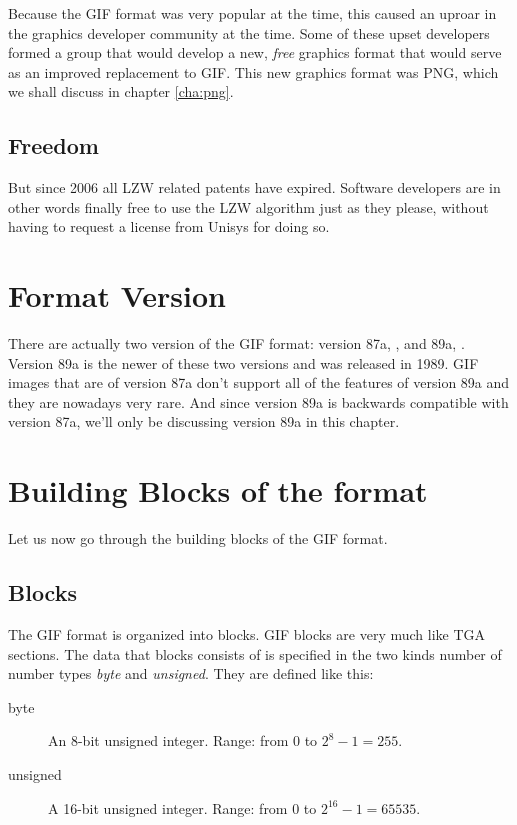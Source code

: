 Because the GIF format was very popular at the time, this caused an
uproar in the graphics developer community at the time. Some of these
upset developers formed a group that would develop a new,
\textit{free} graphics format that would serve as an improved
replacement to GIF. This new graphics format was PNG, which we shall
discuss in chapter \ref{cha:png}.

\subsection{Freedom}

But since 2006 all LZW related patents have expired. Software
developers are in other words finally free to use the LZW algorithm
just as they please, without having to request a license from Unisys
for doing so.

\section{Format Version}

There are actually two version of the GIF format: version 87a,
\cite{gif87a}, and 89a, \cite{gif89a}. Version 89a is the newer of
these two versions and was released in 1989. GIF images that are of
version 87a don't support all of the features of version 89a and they
are nowadays very rare. And since version 89a is backwards compatible
with version 87a, we'll only be discussing version 89a in this
chapter.

\section{Building Blocks of the format}

Let us now go through the building blocks of the GIF format.

\subsection{Blocks}

The GIF format is organized into blocks. GIF blocks are very much like
TGA sections. The data that blocks consists of is specified in the two
kinds number of number types \textit{byte} and \textit{unsigned}. They
are defined like this:

\begin{description}
\item[byte] An 8-bit unsigned integer. Range: from 0 to $2^8 - 1 = 255$.
\item[unsigned] A 16-bit unsigned integer. Range: from 0 to $2^{16} -
  1 = 65535$.
\end{description}

